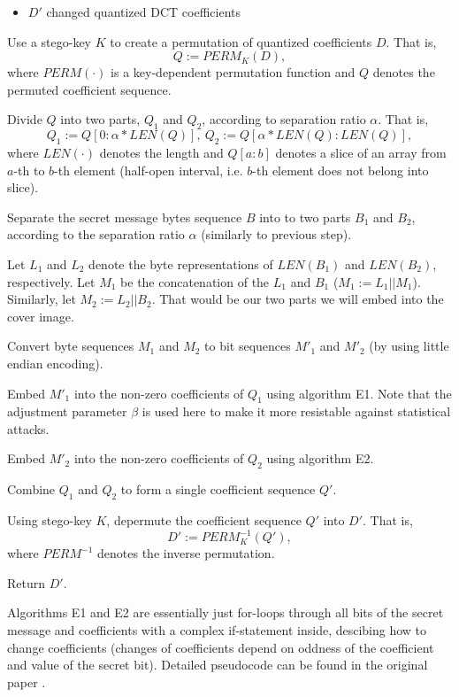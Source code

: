\begin{itemize}
    \item $D'$ changed quantized DCT coefficients
\end{itemize}

\begin{Algo}
\item 
Use a stego-key $K$ to create a permutation of quantized coefficients $D$.
That is, $$Q := PERM_K(D),$$ where $PERM(\cdot)$ is a key-dependent
permutation function and $Q$ denotes the permuted coefficient sequence.
\item
Divide $Q$ into two parts, $Q_1$ and $Q_2$, according to separation ratio $\alpha$.
That is, $$Q_1 := Q[0 : \alpha * LEN(Q)],~ Q_2 := Q[\alpha * LEN(Q) : LEN(Q)],$$
where $LEN(\cdot)$ denotes the length and $Q[a : b]$ denotes a slice of an array from 
$a$-th to $b$-th element (half-open interval, i.e. $b$-th element does not belong into slice).
\item 
Separate the secret message bytes sequence $B$ into to two parts $B_1$ and $B_2$, 
according to the separation ratio $\alpha$ (similarly to previous step).
\item
Let $L_1$ and $L_2$ denote the byte representations of $LEN(B_1)$ and $LEN(B_2)$, respectively.
Let $M_1$ be the concatenation of the $L_1$ and $B_1$ ($M_1 := L_1 || M_1$). Similarly, let
$M_2 := L_2 || B_2$. That would be our two parts we will embed into the cover image.
\item
Convert byte sequences $M_1$ and $M_2$ to bit sequences $M'_1$ and $M'_2$ (by using little endian
encoding).
\item
Embed $M'_1$ into the non-zero coefficients of $Q_1$ using algorithm E1. Note that
the adjustment parameter $\beta$ is used here to make it more resistable against statistical attacks.
\item
Embed $M'_2$ into the non-zero coefficients of $Q_2$ using algorithm E2.
\item
Combine $Q_1$ and $Q_2$ to form a single coefficient sequence $Q'$.
\item 
Using stego-key $K$, depermute the coefficient sequence $Q'$ into $D'$. That is,
$$D' := PERM^{-1}_K(Q'),$$ where $PERM^{-1}$ denotes the inverse permutation.
\item 
Return $D'$.
\end{Algo}

Algorithms E1 and E2 are essentially just for-loops through all bits of the secret message
and coefficients with a complex if-statement inside, descibing how to change coefficients
(changes of coefficients depend on oddness of the coefficient and
value of the secret bit). Detailed pseudocode can be found in the original paper \cite{liu2008high}.

